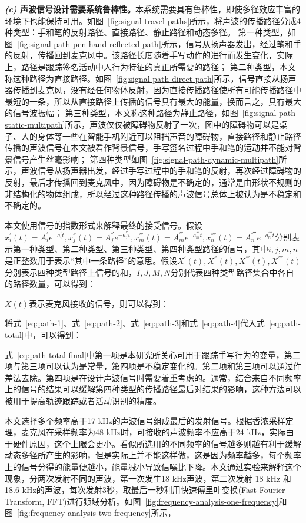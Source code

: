 \textbf{\textit{(c)} 声波信号设计需要系统鲁棒性。}本系统需要具有鲁棒性，即使多径效应丰富的环境下也能保持可用。如图~\ref{fig:signal-travel-paths}所示，将声波的传播路径分成4种类型：手和笔的反射路径、直接路径、静止路径和动态多径。
第一种类型，如图~\ref{fig:signal-path-pen-hand-reflected-path}所示，信号从扬声器发出，经过笔和手的反射，传播回到麦克风中。该路径长度随着手写动作的进行而发生变化，实际上，路径是跟踪签名活动中人行为特征的真正所需要的路径；
第二种类型，本文称这种路径为直接路径。如图~\ref{fig:signal-path-direct-path}所示，信号直接从扬声器传播到麦克风，没有经任何物体反射，因为直接传播路径使所有可能传播路径中最短的一条，所以从直接路径上传播的信号具有最大的能量，换而言之，具有最大的信号波振幅；
第三种类型，本文称这种路径为静止路径，如图~\ref{fig:signal-path-static-multipath}所示，声波仅仅被障碍物反射了一次，图中的障碍物可以是桌子、人的身体等一些在智能手机附近可以阻挡声音的障碍物，直接路径和静止路径传播的声波信号在本文被看作背景信号，手写签名过程中手和笔的运动并不能对背景信号产生丝毫影响；
第四种类型如图~\ref{fig:signal-path-dynamic-multipath}所示，声波信号从扬声器出发，经过手写过程中的手和笔的反射，再次经过障碍物的反射，最后才传播回到麦克风中，因为障碍物是不确定的，通常是由形状不规则的非结构化的物体组成，所以经过这种路径传播的声波信号总体上被认为是不稳定和不确定的。



本文使用信号的指数形式来解释最终的接受信号。假设$x_{i}^{'}(t)=A_{i}^{'}e^{-a_{i}^{'}t},x_{j}^{''}(t)=A_{j}^{''}e^{-a_{j}^{''}t},x_{m}^{'''}(t)=A_{m}^{'''}e^{-a_{m}^{'''}t},x_{n}^{''''}(t)=A_{n}^{''''}e^{-a_{n}^{''''}t}$分别表示第一种类型、第二种类型、第三种类型、第四种类型路径的信号，其中$i,j,m,n$是正整数用于表示“其中一条路径”的意思。假设$X^{'}(t),X^{''}(t),X^{'''}(t),X^{''''}(t)$分别表示四种类型路径上信号的和，$I,J,M,N$分别代表四种类型路径集合中各自的路径数量，可以得到：

$X(t)$表示麦克风接收的信号，则可以得到：

将式~\ref{eq:path-1}、式~\ref{eq:path-2}、式~\ref{eq:path-3}和式~\ref{eq:path-4}代入式~\ref{eq:path-total}中，可以得到：

式~\ref{eq:path-total-final}中第一项是本研究所关心可用于跟踪手写行为的变量，第二项与第三项可以认为是常量，第四项是不稳定变化的。第二项和第三项可以通过作差法去除。第四项是在设计声波信号时需要着重考虑的。通常，结合来自不同频率上的信号的结果可以缓解第四种类型的传播路径最后对结果的影响，这种方法可以被用于提高轨迹跟踪或者活动识别的精度。

本文选择多个频率高于17 kHz的声波信号组成最后的发射信号。根据香浓采样定理，麦克风在采样频率为48 kHz时，可接收的声波频率不应高于24 kHz，实际由于硬件原因，这个上限会更小。看似所选用的不同频率的信号越多则越有利于缓解动态多径所产生的影响，但是实际上并不能这样做，这是因为频率越多，每个频率上的信号分得的能量便越小，能量减小导致信噪比下降。本文通过实验来解释这个现象，分两次发射不同的声波，第一次发生18 kHz声波，第二次发射 18 kHz 和 18.6 kHz的声波，每次发射3秒，取最后一秒利用快速傅里叶变换(Fast Fourier Transform, FFT)进行频域分析。如图~\ref{fig:frequency-analysis-one-frequency}和图~\ref{fig:frequency-analysis-two-frequency}所示，

